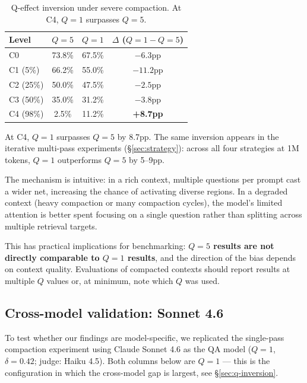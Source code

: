 \begin{table}[h]
\centering
\caption{Q-effect inversion under severe compaction. At C4, $Q=1$ surpasses $Q=5$.}
\label{tab:q-inversion}
\begin{tabular}{lccc}
\toprule
Level & $Q=5$ & $Q=1$ & $\Delta$ ($Q=1 - Q=5$) \\
\midrule
C0       & 73.8\% & 67.5\% & $-6.3$pp \\
C1 (5\%) & 66.2\% & 55.0\% & $-11.2$pp \\
C2 (25\%)& 50.0\% & 47.5\% & $-2.5$pp \\
C3 (50\%)& 35.0\% & 31.2\% & $-3.8$pp \\
C4 (98\%)& 2.5\%  & 11.2\% & \textbf{+8.7pp} \\
\bottomrule
\end{tabular}
\end{table}

At C4, $Q=1$ surpasses $Q=5$ by 8.7pp. The same inversion appears in
the iterative multi-pass experiments (\S\ref{sec:strategy}): across all four strategies at 1M
tokens, $Q=1$ outperforms $Q=5$ by 5--9pp.

The mechanism is intuitive: in a rich context, multiple questions per prompt
cast a wider net, increasing the chance of activating diverse regions. In a
degraded context (heavy compaction or many compaction cycles), the model's
limited attention is better spent focusing on a single question rather than
splitting across multiple retrieval targets.

This has practical implications for benchmarking: \textbf{$Q=5$ results are not
directly comparable to $Q=1$ results}, and the direction of the bias depends
on context quality. Evaluations of compacted contexts should report results
at multiple $Q$ values or, at minimum, note which $Q$ was used.

\subsection{Cross-model validation: Sonnet 4.6}
\label{sec:sonnet}

To test whether our findings are model-specific, we replicated the
single-pass compaction experiment using Claude Sonnet 4.6 as the QA model
($Q=1$, $\delta=0.42$; judge: Haiku 4.5). Both columns below are $Q=1$ --- this is
the configuration in which the cross-model gap is largest, see \S\ref{sec:q-inversion}.

